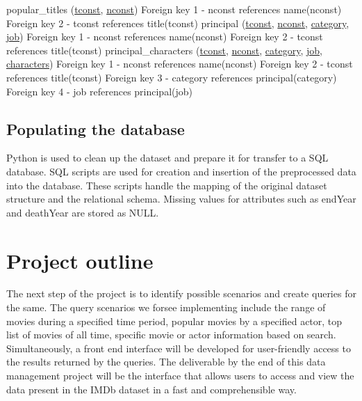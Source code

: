 \documentclass{sig-alternate}
\begin{document}
	popular\_titles (\underline{tconst}, \underline{nconst}) \newline
	Foreign key 1 - nconst references name(nconst) \newline
	Foreign key 2 - tconst references title(tconst) \newline
	principal (\underline{tconst}, \underline{nconst}, \underline{category}, \underline{job}) \newline
	Foreign key 1 - nconst references name(nconst) \newline
	Foreign key 2 - tconst references title(tconst) \newline
	principal\_characters (\underline{tconst}, \underline{nconst}, \underline{category}, \underline{job}, \underline{characters}) \newline
	Foreign key 1 - nconst references name(nconst) \newline
	Foreign key 2 - tconst references title(tconst) \newline
	Foreign key 3 - category references principal(category) \newline
	Foreign key 4 - job references principal(job) \newline
	\subsection{Populating the database}
	Python is used to clean up the dataset and prepare it for transfer to a SQL database. SQL scripts are used for creation and insertion of the preprocessed data into the database. These scripts handle the mapping of the original dataset structure and the relational schema.
	Missing values for attributes such as endYear and deathYear are stored as NULL.
	\section{Project outline}
	The next step of the project is to identify possible scenarios and create queries for the same. The query scenarios we forsee implementing include the range of movies during a specified time period, popular movies by a specified actor, top list of movies of all time, specific movie or actor information based on search. Simultaneously, a front end interface will be developed for user-friendly access to the results returned by the queries. The deliverable by the end of this data management project will be the interface that allows users to access and view the data present in the IMDb dataset in a fast and comprehensible way. 
\end{document}
